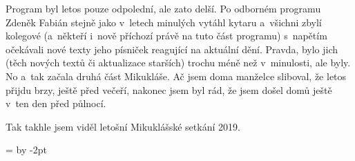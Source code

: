 Program byl letos pouze odpolední, ale zato delší. Po odborném programu Zdeněk Fabián stejně jako v~letech minulých vytáhl kytaru a~všichni zbylí kolegové (a~někteří i~nově příchozí právě na tuto část programu) s~napětím očekávali nové texty jeho písniček reagující na aktuální dění. Pravda, bylo jich (těch nových textů či aktualizace starších) trochu méně než v~minulosti, ale byly. No a~tak začala druhá část Mikukláše. Ač jsem doma manželce sliboval, že letos přijdu brzy, ještě před večeří, nakonec jsem byl rád, že jsem došel domů ještě v~ten den před půlnocí. 

Tak takhle jsem viděl letošní Mikuklášské setkání 2019.
\vfil

\newdimen\maltemp \maltemp=\textwidth
\advance\maltemp by -2pt
\fboxrule=1pt
\fboxsep=0pt

\noindent
{}

\newpage
\noindent
{}%
\medskip

\noindent
{}

